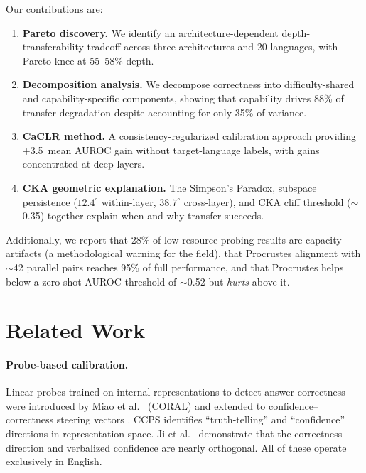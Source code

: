 \documentclass[11pt,a4paper]{article}
\newcommand{\pp}{\,\text{pp}}
\begin{document}
Our contributions are:
\begin{enumerate}
\item \textbf{Pareto discovery.} We identify an architecture-dependent depth-transferability tradeoff across three architectures and 20 languages, with Pareto knee at 55--58\% depth.
\item \textbf{Decomposition analysis.} We decompose correctness into difficulty-shared and capability-specific components, showing that capability drives 88\% of transfer degradation despite accounting for only 35\% of variance.
\item \textbf{CaCLR method.} A consistency-regularized calibration approach providing +3.5\pp{} mean AUROC gain without target-language labels, with gains concentrated at deep layers.
\item \textbf{CKA geometric explanation.} The Simpson's Paradox, subspace persistence ($12.4^{\circ}$ within-layer, $38.7^{\circ}$ cross-layer), and CKA cliff threshold ($\sim$0.35) together explain when and why transfer succeeds.
\end{enumerate}
Additionally, we report that 28\% of low-resource probing results are capacity artifacts (a methodological warning for the field), that Procrustes alignment with $\sim$42 parallel pairs reaches 95\% of full performance, and that Procrustes helps below a zero-shot AUROC threshold of $\sim$0.52 but \emph{hurts} above it.

\section{Related Work}
\label{sec:related}

\paragraph{Probe-based calibration.}
Linear probes trained on internal representations to detect answer correctness were introduced by Miao et al.\ \cite{miao2026coral} (CORAL) and extended to confidence--correctness steering vectors \cite{miao2026steering}. CCPS \cite{ji2024llm} identifies ``truth-telling'' and ``confidence'' directions in representation space. Ji et al.\ \cite{ji2024llm} demonstrate that the correctness direction and verbalized confidence are nearly orthogonal. All of these operate exclusively in English.
\end{document}
